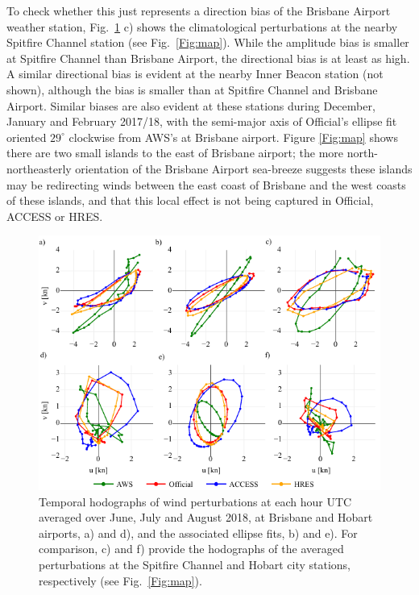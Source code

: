 \documentclass[twocol]{ametsoc}
\begin{document}
To check whether this just represents a direction bias of the Brisbane Airport weather station, Fig.~\ref{Fig:ellipse_hodo} c) shows the climatological perturbations at the nearby Spitfire Channel station (see Fig.~\ref{Fig:map}). While the amplitude bias is smaller at Spitfire Channel than Brisbane Airport, the directional bias is at least as high. A similar directional bias is evident at the nearby Inner Beacon station (not shown), although the bias is smaller than at Spitfire Channel and Brisbane Airport. Similar biases are also evident at these stations during December, January and February 2017/18, with the semi-major axis of Official's ellipse fit oriented $29^\circ$ clockwise from AWS's at Brisbane airport. Figure \ref{Fig:map} shows there are two small islands to the east of Brisbane airport; the more north-northeasterly orientation of the Brisbane Airport sea-breeze suggests these islands may be redirecting winds between the east coast of Brisbane and the west coasts of these islands, and that this local effect is not being captured in Official, ACCESS or HRES. 

\begin{figure}
\centering
\includegraphics[width=39pc]{ellipse_hodo.pdf}
\caption{Temporal hodographs of wind perturbations at each hour UTC averaged over June, July and August 2018, at Brisbane and Hobart airports, a) and d), and the associated ellipse fits, b) and e). For comparison, c) and f) provide the hodographs of the averaged perturbations at the Spitfire Channel and Hobart city stations, respectively (see Fig.~\ref{Fig:map}).}
\label{Fig:ellipse_hodo}
\end{figure}
\end{document}
